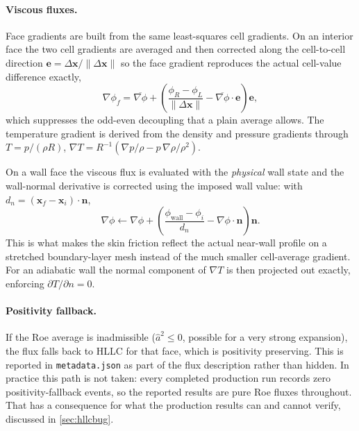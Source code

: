 \paragraph{Viscous fluxes.} Face gradients are built from the same
least-squares cell gradients. On an interior face the two cell gradients are
averaged and then corrected along the cell-to-cell direction
$\mathbf{e}=\Delta\mathbf{x}/\|\Delta\mathbf{x}\|$ so the face gradient
reproduces the actual cell-value difference exactly,
\begin{equation}
  \nabla\phi_f=\overline{\nabla\phi}
  +\left(\frac{\phi_R-\phi_L}{\|\Delta\mathbf{x}\|}
  -\overline{\nabla\phi}\cdot\mathbf{e}\right)\mathbf{e},
  \label{eq:facegrad}
\end{equation}
which suppresses the odd-even decoupling that a plain average allows. The
temperature gradient is derived from the density and pressure gradients through
$T=p/(\rho R)$,
$\nabla T=R^{-1}\left(\nabla p/\rho-p\,\nabla\rho/\rho^2\right)$.

On a wall face the viscous flux is evaluated with the \emph{physical} wall state
and the wall-normal derivative is corrected using the imposed wall value: with
$d_n=(\mathbf{x}_f-\mathbf{x}_i)\cdot\mathbf{n}$,
\begin{equation}
  \nabla\phi \leftarrow \nabla\phi
  +\left(\frac{\phi_{\mathrm{wall}}-\phi_i}{d_n}
  -\nabla\phi\cdot\mathbf{n}\right)\mathbf{n}.
  \label{eq:wallgrad}
\end{equation}
This is what makes the skin friction reflect the actual near-wall profile on a
stretched boundary-layer mesh instead of the much smaller cell-average gradient.
For an adiabatic wall the normal component of $\nabla T$ is then projected out
exactly, enforcing $\partial T/\partial n=0$.

\paragraph{Positivity fallback.} If the Roe average is inadmissible
($\hat{a}^2\le0$, possible for a very strong expansion), the flux falls back to
HLLC for that face, which is positivity preserving. This is reported in
\texttt{metadata.json} as part of the flux description rather than hidden. In
practice this path is not taken: every completed production run records zero
positivity-fallback events, so the reported results are pure Roe fluxes
throughout. That has a consequence for what the
production results can and cannot verify, discussed in \cref{sec:hllcbug}.

